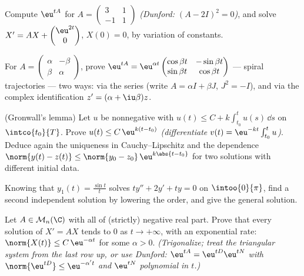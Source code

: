\begin{exercise}[$\star\star$]\label{exo:b2:diffeq:4}
Compute $\eu^{tA}$ for $A = \begin{pmatrix} 3 & 1\\ -1 &
1\end{pmatrix}$ \emph{(Dunford: $(A - 2I)^2 = 0$)}, and solve $X' =
AX + \begin{pmatrix} \eu^{2t}\\ 0\end{pmatrix}$, $X(0) = 0$, by
variation of constants.
\end{exercise}

\begin{exercise}[$\star\star$]\label{exo:b2:diffeq:5}
For $A = \begin{pmatrix} \alpha & -\beta\\ \beta &
\alpha\end{pmatrix}$, prove $\eu^{tA} =
\eu^{\alpha t}\begin{pmatrix} \cos\beta t & -\sin\beta t\\
\sin\beta t & \cos\beta t\end{pmatrix}$ --- spiral trajectories ---
two ways: via the series (write $A = \alpha I + \beta J$, $J^2 =
-I$), and via the complex identification $z' = (\alpha +
\iu\beta)z$.
\end{exercise}

\begin{exercise}[$\star\star$]\label{exo:b2:diffeq:6}
(Gronwall's lemma) Let $u$ be  nonnegative with $u(t)
\leq C + k\int_{t_0}^{t} u(s)\,\dd s$ on $\intco{t_0}{T}$. Prove
$u(t) \leq C\,\eu^{k(t - t_0)}$ \emph{(differentiate $v(t) =
\eu^{-kt}\int_{t_0}^t u$)}. Deduce again the uniqueness in
Cauchy--Lipschitz and the  dependence $\norm{y(t) -
z(t)} \leq \norm{y_0 - z_0}\,\eu^{k\abs{t - t_0}}$ for two
solutions with different initial data.
\end{exercise}

\begin{exercise}[$\star\star$]\label{exo:b2:diffeq:7}
Knowing that $y_1(t) = \frac{\sin t}{t}$ solves $ty'' + 2y' + ty =
0$ on $\intoo{0}{\pi}$, find a second independent solution by
lowering the order, and give the general solution.
\end{exercise}

\begin{exercise}[$\star\star\star$]\label{exo:b2:diffeq:8}
Let $A \in \mathcal{M}_n(\C)$ with all  of (strictly)
negative real part. Prove that every solution of $X' = AX$ tends to
$0$ as $t \to +\infty$, with an exponential rate: $\norm{X(t)}
\leq C\,\eu^{-\alpha t}$ for some $\alpha > 0$.
\emph{(Trigonalize; treat the triangular system from the last row
up, or use Dunford: $\eu^{tA} = \eu^{tD}\eu^{tN}$ with
$\norm{\eu^{tD}} \leq \eu^{-\alpha' t}$ and $\eu^{tN}$ polynomial
in $t$.)}
\end{exercise}

